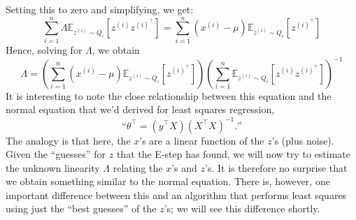 Setting this to zero and simplifying, we get:
\[
    \sum^n_{i=1} \Lambda \mathbb E_{z^{(i)} \sim Q_i} \left[z^{(i)}z^{(i)^\top}\right] = \sum^n_{i=1} (x^{(i)} - \mu) \mathbb E_{z^{(i)}\sim Q_i}\left[z^{(i)^\top}\right]
\]
Hence, solving for $\Lambda$, we obtain
\begin{equation}\label{eq:Lambda}
    \Lambda = \left(\sum^n_{i=1} (x^{(i)} - \mu)\mathbb E_{z^{(i)}\sim Q_i}\left[z^{(i)^\top}\right]\right) \left(\sum^n_{i=1} \mathbb E_{z^{(i)}\sim Q_i}\left[z^{(i)}z^{(i)^\top}\right]\right)^{-1}
\end{equation}
It is interesting to note the close relationship between this equation and the
normal equation that we'd derived for least squares regression,
\[
\text{``}\theta^\top = (y^\top X)(X^\top X)^{-1}\text{.''}
\]
The analogy is that here, the $x$'s are a linear function of the $z$'s (plus noise).
Given the ``guesses'' for $z$ that the E-step has found, we will now try to
estimate the unknown linearity $\Lambda$ relating the $x$'s and $z$'s. It is therefore
no surprise that we obtain something similar to the normal equation. There
is, however, one important difference between this and an algorithm that
performs least squares using just the ``best guesses'' of the $z$'s; we will see
this difference shortly.

